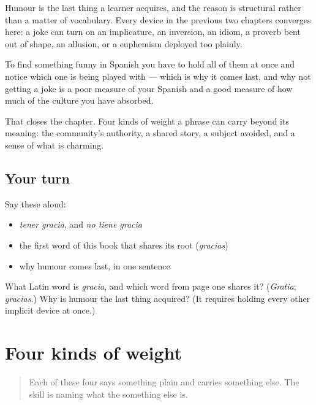 \begin{grammarlens}[title={What you've built}]
Humour is the last thing a learner acquires, and the reason is structural rather than a matter of vocabulary. Every device in the previous two chapters converges here: a joke can turn on an implicature, an inversion, an idiom, a proverb bent out of shape, an allusion, or a euphemism deployed too plainly.

To find something funny in Spanish you have to hold all of them at once and notice which one is being played with — which is why it comes last, and why not getting a joke is a poor measure of your Spanish and a good measure of how much of the culture you have absorbed.

That closes the chapter. Four kinds of weight a phrase can carry beyond its meaning: the community's authority, a shared story, a subject avoided, and a sense of what is charming.
\end{grammarlens}

\subsection*{Your turn}
Say these aloud:

\begin{itemize}
\raggedright
  \item \emph{tener gracia}, and \emph{no tiene gracia}
  \item the first word of this book that shares its root (\emph{gracias})
  \item why humour comes last, in one sentence
\end{itemize}

\begin{tcolorbox}[breakable,colback=teal!4,colframe=teal!35!black,title={Before you move on}]
What Latin word is \emph{gracia}, and which word from page one shares it? (\emph{Gratia}; \emph{gracias}.) Why is humour the last thing acquired? (It requires holding every other implicit device at once.)
\end{tcolorbox}
\section[Practice]{Four kinds of weight}

\label{lesson:ES-C274-practice}



\begin{quote}
Each of these four says something plain and carries something else. The skill is naming what the something else is.
\end{quote}

